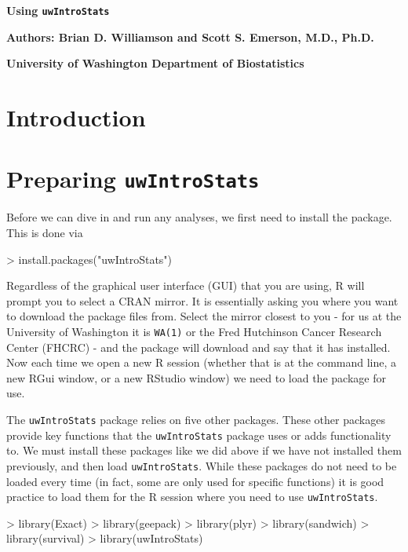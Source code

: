 \documentclass[landscape]{article}
\renewenvironment{Schunk}{\vspace{\topsep}}{\vspace{\topsep}}
\begin{document}

\centerline{\large{\textbf{Using \texttt{uwIntroStats}}}}
\centerline{\textbf{Authors: Brian D. Williamson and Scott S. Emerson, M.D., Ph.D.}}
\centerline{\textbf{University of Washington Department of Biostatistics}}
\tableofcontents
\newpage
\section{Introduction}

\section{Preparing \texttt{uwIntroStats}}


\indent Before we can dive in and run any analyses, we first need to install the package. This is done via
\begin{Schunk}
\begin{Sinput}
> install.packages("uwIntroStats")
\end{Sinput}
\end{Schunk}


Regardless of the graphical user interface (GUI) that you are using, R will prompt you to select a CRAN mirror. It is essentially asking you where you want to download the package files from. Select the mirror closest to you - for us at the University of Washington it is \texttt{WA(1)} or the Fred Hutchinson Cancer Research Center (FHCRC) - and the package will download and say that it has installed. Now each time we open a new R session (whether that is at the command line, a new RGui window, or a new RStudio window) we need to load the package for use. 

The \texttt{uwIntroStats} package relies on five other packages. These other packages provide key functions that the \texttt{uwIntroStats} package uses or adds functionality to. We must install these packages like we did above if we have not installed them previously, and then load \texttt{uwIntroStats}. While these packages do not need to be loaded every time (in fact, some are only used for specific functions) it is good practice to load them for the R session where you need to use \texttt{uwIntroStats}.
\begin{Schunk}
\begin{Sinput}
> library(Exact)
> library(geepack)
> library(plyr)
> library(sandwich)
> library(survival)
> library(uwIntroStats)
\end{Sinput}
\end{Schunk}
\end{document}
